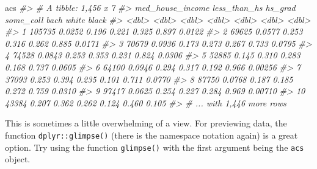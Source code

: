 \documentclass[
]{book}
\newenvironment{Shaded}{\begin{snugshade}}{\end{snugshade}}
\newcommand{\CommentTok}[1]{\textcolor[rgb]{0.56,0.35,0.01}{\textit{#1}}}
\newcommand{\NormalTok}[1]{#1}
\begin{document}
\begin{Shaded}
\begin{Highlighting}[]
\NormalTok{acs}
\CommentTok{\#\textgreater{} \# A tibble: 1,456 x 7}
\CommentTok{\#\textgreater{}    med\_house\_income less\_than\_hs hs\_grad some\_coll  bach white   black}
\CommentTok{\#\textgreater{}               \textless{}dbl\textgreater{}        \textless{}dbl\textgreater{}   \textless{}dbl\textgreater{}     \textless{}dbl\textgreater{} \textless{}dbl\textgreater{} \textless{}dbl\textgreater{}   \textless{}dbl\textgreater{}}
\CommentTok{\#\textgreater{}  1           105735       0.0252   0.196     0.221 0.325 0.897 0.0122 }
\CommentTok{\#\textgreater{}  2            69625       0.0577   0.253     0.316 0.262 0.885 0.0171 }
\CommentTok{\#\textgreater{}  3            70679       0.0936   0.173     0.273 0.267 0.733 0.0795 }
\CommentTok{\#\textgreater{}  4            74528       0.0843   0.253     0.353 0.231 0.824 0.0306 }
\CommentTok{\#\textgreater{}  5            52885       0.145    0.310     0.283 0.168 0.737 0.0605 }
\CommentTok{\#\textgreater{}  6            64100       0.0946   0.294     0.317 0.192 0.966 0.00256}
\CommentTok{\#\textgreater{}  7            37093       0.253    0.394     0.235 0.101 0.711 0.0770 }
\CommentTok{\#\textgreater{}  8            87750       0.0768   0.187     0.185 0.272 0.759 0.0310 }
\CommentTok{\#\textgreater{}  9            97417       0.0625   0.254     0.227 0.284 0.969 0.00710}
\CommentTok{\#\textgreater{} 10            43384       0.207    0.362     0.262 0.124 0.460 0.105  }
\CommentTok{\#\textgreater{} \# ... with 1,446 more rows}
\end{Highlighting}
\end{Shaded}

This is sometimes a little overwhelming of a view. For previewing data, the function \texttt{dplyr::glimpse()} (there is the namespace notation again) is a great option. Try using the function \texttt{glimpse()} with the first argument being the \texttt{acs} object.
\end{document}
